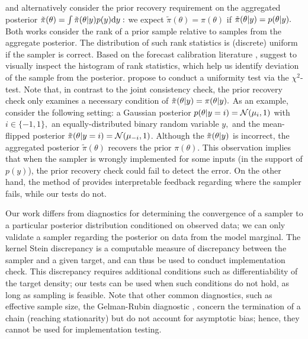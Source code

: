 \documentclass{article}
\newcommand{\tildepi}{\tilde{\pi}}
\begin{document}
\cite{talts_validating_2018} and \cite{gandy_unit_2020} alternatively consider the prior recovery requirement on the aggregated posterior $\tildepi(\theta)=\int \tildepi(\theta\given y)p(y)\dd y:$ we expect $\tildepi(\theta)=\pi(\theta)$ if $\tildepi(\theta\given y)=p(\theta\given y).$
Both works consider the rank of a prior sample relative to samples from the aggregate posterior.
The distribution of such rank statistics is (discrete) uniform if the sampler is correct.
Based on the forecast calibration literature \citep{}, \cite{talts_validating_2018} suggest to visually inspect the histogram of rank statistics, which help us identify deviation of the sample from the posterior. 
\cite{gandy_unit_2020} propose to conduct a uniformity test via the $\chi^2$-test. 
Note that, in contrast to the joint consistency check, the prior recovery check only examines a necessary condition of $\tildepi(\theta\given y)=\pi(\theta\given y).$
As an example, consider the following setting: a Gaussian posterior $p(\theta\vert y=i) = \mathcal{N}(\mu_i, 1)$ with $i\in \{-1, 1\}, $ an equally-distributed binary random variable $y,$ and the mean-flipped posterior $\tildepi(\theta\given y=i) = \mathcal{N}(\mu_{-i}, 1)$. 
Although the $\tildepi(\theta\given y)$ is incorrect, the aggregated posterior $\tildepi(\theta)$ recovers the prior $\pi(\theta).$
This observation implies that when the sampler is wrongly implemented for some inputs (in the support of $p(y)$), the prior recovery check could fail to detect the error.
On the other hand, the method of \cite{talts_validating_2018} provides interpretable feedback regarding where the sampler fails, while our tests do not.

Our work differs from diagnostics for determining the convergence of a sampler to a particular posterior distribution conditioned on observed data; we can only validate a sampler regarding the posterior on data from the model marginal. 
The kernel Stein discrepancy \citep{Chwialkowski2016, liu_kernelized_2016, Gorham2017} is a computable measure of discrepancy between the sampler and a given target, and can thus be used to conduct implementation check.
This discrepancy requires additional conditions such as differentiability of the target density; our tests can be used when such conditions do not hold, as long as sampling is feasible.
Note that other common diagnostics, such as effective sample size, the Gelman-Rubin diagnostic \citep{gelman_inference_1992}, concern the termination of a chain (reaching stationarity) but do not account for asymptotic bias; hence, they cannot be used for implementation testing. 
\end{document}
